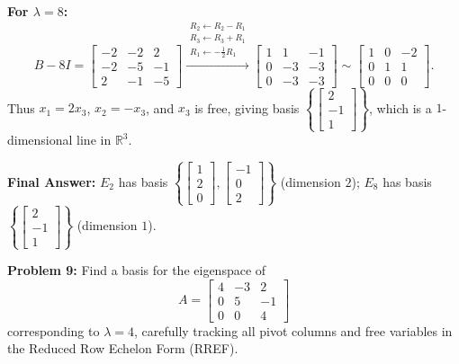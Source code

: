 \documentclass[11pt, letterpaper]{article}
\theoremstyle{definition}
\theoremstyle{remark}
\begin{document}
\textbf{For $\lambda = 8$:}
\[
B - 8I = \begin{bmatrix} -2 & -2 & 2 \\ -2 & -5 & -1 \\ 2 & -1 & -5 \end{bmatrix}
\xrightarrow{\substack{R_2 \leftarrow R_2 - R_1 \\ R_3 \leftarrow R_3 + R_1 \\ R_1 \leftarrow -\frac{1}{2}R_1}}
\begin{bmatrix} 1 & 1 & -1 \\ 0 & -3 & -3 \\ 0 & -3 & -3 \end{bmatrix}
\sim
\begin{bmatrix} 1 & 0 & -2 \\ 0 & 1 & 1 \\ 0 & 0 & 0 \end{bmatrix}.
\]
Thus $x_1 = 2x_3$, $x_2 = -x_3$, and $x_3$ is free, giving basis $\left\{ \begin{bmatrix} 2 \\ -1 \\ 1 \end{bmatrix} \right\}$, which is a $1$-dimensional line in $\mathbb{R}^3$.

\textbf{Final Answer:} $E_2$ has basis $\left\{ \begin{bmatrix} 1 \\ 2 \\ 0 \end{bmatrix}, \begin{bmatrix} -1 \\ 0 \\ 2 \end{bmatrix} \right\}$ (dimension $2$); $E_8$ has basis $\left\{ \begin{bmatrix} 2 \\ -1 \\ 1 \end{bmatrix} \right\}$ (dimension $1$).

\vspace{0.4em}
\textbf{Problem 9:}
Find a basis for the eigenspace of
\[
A = \begin{bmatrix} 4 & -3 & 2 \\ 0 & 5 & -1 \\ 0 & 0 & 4 \end{bmatrix}
\]
corresponding to $\lambda = 4$, carefully tracking all pivot columns and free variables in the Reduced Row Echelon Form (RREF).
\end{document}
